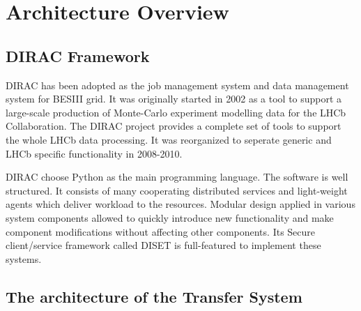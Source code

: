 \section{Architecture Overview}

\subsection{DIRAC Framework}

DIRAC has been adopted as the job management system and data management
system for BESIII grid. It was originally started in 2002 as a tool
to support a large-scale production of Monte-Carlo experiment modelling
data for the LHCb Collaboration. The DIRAC project provides a 
complete set of tools to support the whole LHCb data processing.
It was reorganized to seperate generic and LHCb specific functionality
in 2008-2010.

DIRAC choose Python as the main programming language.
The software is well structured. 
It consists of many cooperating distributed services and light-weight
agents which deliver workload to the resources.
Modular design applied in various system components allowed to quickly
introduce new functionality and make component modifications without
affecting other components.
Its Secure client/service framework called DISET is full-featured
to implement these systems.

\subsection{The architecture of the Transfer System}
